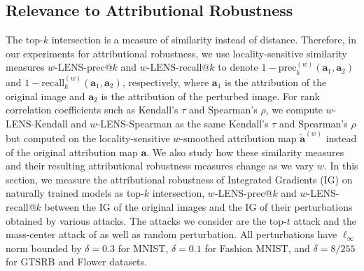 \documentclass[letterpaper]{article} %
\def\ba{\mathbf{a}}
\begin{document}

\subsection{Relevance to Attributional Robustness} \label{subsec:lens-relevance-robustness}
The top-$k$ intersection is a measure of similarity instead of distance. Therefore, in our experiments for attributional robustness, we use locality-sensitive similarity measures $w\text{-LENS-prec@}k$ and $w\text{-LENS-recall@}k$ to denote $1 - \text{prec}_{k}^{(w)}(\ba_{1}, \ba_{2})$ and $1 - \text{recall}_{k}^{(w)}(\ba_{1}, \ba_{2})$, respectively, where $\ba_{1}$ is the attribution of the original image and $\ba_{2}$ is the attribution of the perturbed image. For rank correlation coefficients such as Kendall's $\tau$ and Spearman's $\rho$, we compute $w$-LENS-Kendall and $w$-LENS-Spearman as the same Kendall's $\tau$ and Spearman's $\rho$ but computed on the locality-sensitive $w$-smoothed attribution map $\tilde{\ba}^{(w)}$ instead of the original attribution map $\ba$. We also study how these similarity measures and their resulting attributional robustness measures change as we vary $w$.
%
In this section, we measure the attributional robustness of Integrated Gradients (IG) on naturally trained models as top-$k$ intersection, $w$-LENS-prec@$k$ and $w$-LENS-recall@$k$ between the IG of the original images and the IG of their perturbations obtained by various attacks. The attacks we consider are the top-$t$ attack and the mass-center attack of \citet{ghorbani2018interpretation} as well as random perturbation. All perturbations have $\ell_{\infty}$ norm bounded by $\delta=0.3$ for MNIST, $\delta=0.1$ for Fashion MNIST, and $\delta=8/255$ for GTSRB and Flower datasets. 
\end{document}
